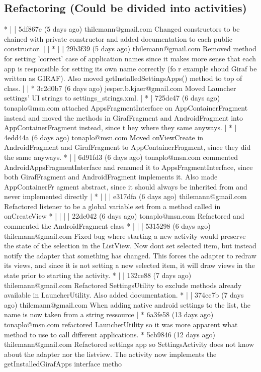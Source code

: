 \subsection{Refactoring (Could be divided into activities)}
* | | 5df867e (5 days ago) thilemann@gmail.com Changed constructors to be chained with private constructor and added documentation to each public constructor.
| | * | | 29b3f39 (5 days ago) thilemann@gmail.com Removed method for setting 'correct' case of application names since it makes more sense that each app is responsible for setting its own name correctly (fo
r example shoud Giraf be written as GIRAF). Also moved getInstalledSettingsApps() method to top of class.
| | * 3c2d0b7 (6 days ago) jesper.b.kjaer@gmail.com Moved Launcher settings' UI strings to settings_strings.xml.
| * | 725dc47 (6 days ago) tonaplo@msn.com attached AppsFragmentInterface on AppContainerFragment instead and moved the methods in GirafFragment and AndroidFragment into AppContainerFragment instead, since t
hey where they same anyways.
| * | 4edd44a (6 days ago) tonaplo@msn.com Moved onViewCreate in AndroidFragment and GirafFragment to AppContainerFragment, since they did the same anyways.
* | | 6d91fd3 (6 days ago) tonaplo@msn.com commented AndroidAppsFragmentInterface and renamed it to AppsFragmentInterface, since both GirafFragment and AndroidFragment implements it. Also made AppContainerFr
agment abstract, since it should always be inherited from and never implemented directly
| * | | | e317dfa (6 days ago) thilemann@gmail.com Refactored listener to be a global variable set from a method called in onCreateView
* | | | | 22dc042 (6 days ago) tonaplo@msn.com Refactored and commented the AndroidFragment class
* | | | 5315298 (6 days ago) thilemann@gmail.com Fixed bug where starting a new activity would preserve the state of the selection in the ListView. Now dont set selected item, but instead notify the adapter
that something has changed. This forces the adapter to redraw its views, and since it is not setting a new selected item, it will draw views in the state prior to starting the activity.
* | | 132ce88 (7 days ago) thilemann@gmail.com Refactored SettingsUtility to exclude methods already available in LauncherUtility. Also added documentation.
* | | 374cc7b (7 days ago) thilemann@gmail.com When adding native android settings to the list, the name is now taken from a string ressource
| * 6a3fe58 (13 days ago) tonaplo@msn.com refactored LauncherUtility so it was more apparent what method to use to call different applications.
* 5cb9846 (12 days ago) thilemann@gmail.com Refactored settings app so SettingsActivity does not know about the adapter nor the listview. The activity now implements the getInstalledGirafApps interface metho
